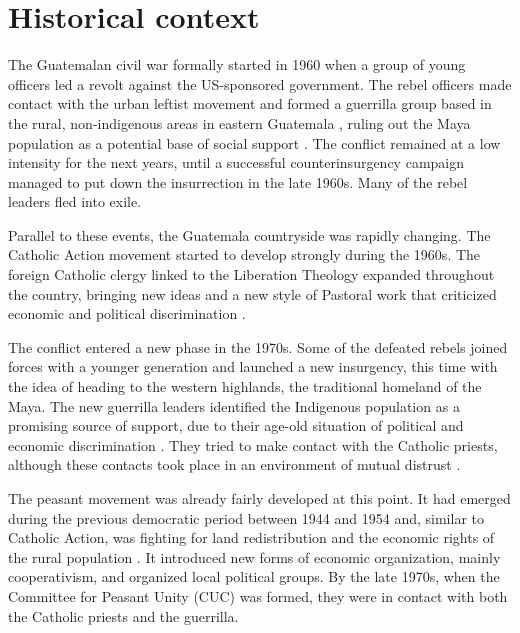 \documentclass[12pt, notitlepage]{article}
\begin{document}
\section*{Historical context}

The Guatemalan civil war formally started in 1960 when a group of young officers led a revolt against the US-sponsored government.
The rebel officers made contact with the urban leftist movement and formed a guerrilla group based in the rural, non-indigenous areas in eastern Guatemala \citep{Arias:1992aa}, ruling out the Maya population as a potential base of social support \citep{Smith:1990ab}.
The conflict remained at a low intensity for the next years, until a successful counterinsurgency campaign managed to put down the insurrection in the late 1960s.
Many of the rebel leaders fled into exile.

Parallel to these events, the Guatemala countryside was rapidly changing.
The Catholic Action movement started to develop strongly during the 1960s.
The foreign Catholic clergy linked to the Liberation Theology expanded throughout the country, bringing new ideas and a new style of Pastoral work that criticized economic and political discrimination \citep{Arias:1992aa, Nelson:2009aa, Stoll:1999aa}.

The conflict entered a new phase in the 1970s.
Some of the defeated rebels joined forces with a younger generation and launched a new insurgency, this time with the idea of heading to the western highlands, the traditional homeland of the Maya.
The new guerrilla leaders identified the Indigenous population as a promising source of support, due to their age-old situation of political and economic discrimination \citep{Payeras:1981aa, Arias:1992aa}.
They tried to make contact with the Catholic priests, although these contacts took place in an environment of mutual distrust \citep[e.g.][]{Manz:2004aa}.

The peasant movement was already fairly developed at this point.
It had emerged during the previous democratic period between 1944 and 1954 and, similar to Catholic Action, was fighting for land redistribution and the economic rights of the rural population \citep{Handy:1994aa, Forster:2001aa}.
It introduced new forms of economic organization, mainly cooperativism, and organized local political groups.
By the late 1970s, when the Committee for Peasant Unity (CUC) was formed, they were in contact with both the Catholic priests and the guerrilla.
\end{document}
